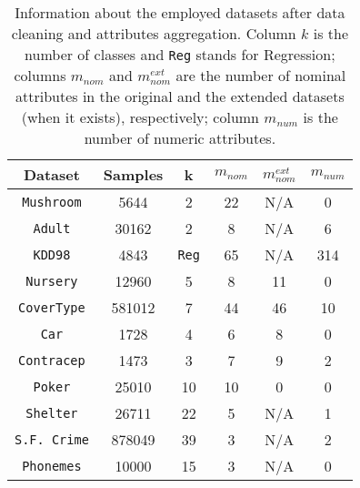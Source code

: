 \begin{table}
\centering
\begin{tabular}{c|c|c|c|c|c}
Dataset             & Samples  &  k        & $m_{nom}$ &  $m^{ext}_{nom}$ &   $m_{num}$   \\  \hline
{\tt Mushroom}      & 5644     & 2         & 22        & N/A              & 0             \\ 
{\tt Adult}         & 30162    & 2         & 8         & N/A              & 6             \\
{\tt KDD98}         & 4843     & {\tt Reg} & 65        & N/A              & 314           \\ 
{\tt Nursery}       & 12960    & 5         & 8         & 11               & 0             \\ 
{\tt CoverType}     & 581012   & 7         & 44        & 46               & 10            \\ 
{\tt Car}           & 1728     & 4         & 6         & 8                & 0             \\ 
{\tt Contracep}     & 1473     & 3         & 7         & 9                & 2             \\ 
{\tt Poker}         & 25010    & 10        & 10        & 0                & 0             \\
{\tt Shelter}       & 26711    & 22        & 5         & N/A              & 1             \\      
{\tt S.F. Crime}    & 878049   & 39        & 3         & N/A              & 2             \\  
{\tt Phonemes}      & 10000    & 15        & 3         & N/A              & 0 
\normalsize
\end{tabular}
\caption{Information about  the employed datasets after data cleaning and attributes aggregation.
Column $k$ is the number of classes and {\tt Reg} stands
for Regression; columns $m_{nom}$ and $m^{ext}_{nom}$ are the
number of  nominal attributes in the original and the
extended datasets (when it exists), respectively; column $m_{num}$ is the number of  numeric attributes.}
\label{exp:datasets}

\end{table}



